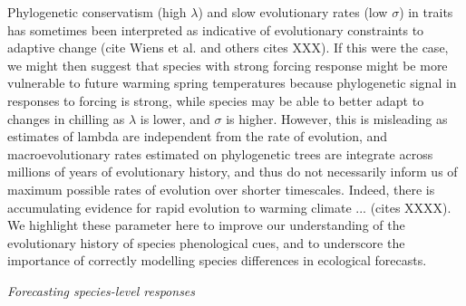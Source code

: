\documentclass{article}\usepackage[]{graphicx}\usepackage[]{color}
\begin{document}
Phylogenetic conservatism (high $\lambda$) and slow evolutionary rates (low $\sigma$) in traits has sometimes been interpreted as indicative of evolutionary constraints to adaptive change (cite Wiens et al. and others cites XXX). If this were the case, we might then suggest that species with strong forcing response might be more vulnerable to future warming spring temperatures because phylogenetic signal in responses to forcing is strong, while species may be able to better adapt to changes in chilling as $\lambda$ is lower, and $\sigma$ is higher. However, this is misleading as estimates of lambda are independent from the rate of evolution, and macroevolutionary rates estimated on phylogenetic trees are integrate across millions of years of evolutionary history, and thus do not necessarily inform us of maximum possible rates of evolution over shorter timescales. Indeed, there is accumulating evidence for rapid evolution to warming climate ... (cites XXXX). We highlight these parameter here to improve our understanding of the evolutionary history of species phenological cues, and to underscore the importance of correctly modelling species differences in ecological forecasts. 



\emph{Forecasting species-level responses}
\end{document}
